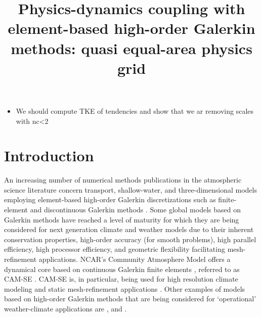 \documentclass[twocol]{ametsoc}
\title{Physics-dynamics coupling with element-based high-order Galerkin methods: quasi equal-area physics grid}
\affiliation{School of Marine and Atmospheric Sciences, Stony Brook University, State University of New York, Stony Brook, New York.}
\begin{document}
\maketitle


%

\begin{itemize}
\item We should compute TKE of tendencies and show that we ar removing scales with nc<2
\end{itemize}
\section{Introduction}
An increasing number of numerical methods publications in the atmospheric science literature concern transport, shallow-water, and three-dimensional models employing element-based high-order Galerkin discretizations such as finite-element and discontinuous Galerkin methods \citep[for an introduction to these methods see, e.g., ][]{Durran,NLL2011LNCSE}. Some global models based on Galerkin methods have reached a level of maturity for which they are being considered for next generation climate and weather models due to their inherent conservation properties, high-order accuracy (for smooth problems), high parallel efficiency, high processor efficiency, and geometric flexibility facilitating mesh-refinement applications. NCAR's Community Atmosphere Model \citep[CAM; ][]{CAM5} offers a dynamical core based on continuous Galerkin finite elements \citep{TF2010JCP}, referred to as CAM-SE \citep[CAM Spectral Elements; ][]{DetAl2012IJHPCA,TES2008JPCS}. CAM-SE is, in particular, being used for high resolution climate modeling \citep[e.g., ][]{JAME:JAME20125} and static mesh-refinement applications \citep{FT2004MWR,ZJT2013,ZetAl2014JC,GetAl2014GMD}. Other examples of models based on high-order Galerkin methods that are being considered for `operational' weather-climate applications are \citet{Giraldo20083849}, \citet{NCT2009CF} and \citet{BSBDK2013TCFD}.
\end{document}
